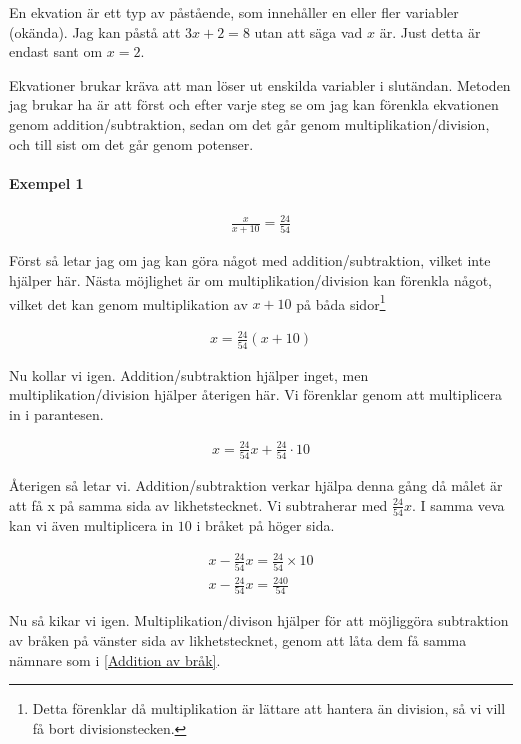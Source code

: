En ekvation är ett typ av påstående, som innehåller en eller fler variabler (okända). Jag kan påstå att $3x+2 = 8$ utan att säga vad $x$ är. Just detta är endast sant om $x=2$.

Ekvationer brukar kräva att man löser ut enskilda variabler i slutändan. Metoden jag brukar ha är att först och efter varje steg se om jag kan förenkla ekvationen genom addition/subtraktion, sedan om det går genom multiplikation/division, och till sist om det går genom potenser.

\paragraph{Exempel 1}

\begin{align*}
	\frac{x}{x+10} = \frac{24}{54}
\end{align*}

Först så letar jag om jag kan göra något med addition/subtraktion, vilket inte hjälper här. Nästa möjlighet är om multiplikation/division kan förenkla något, vilket det kan genom multiplikation av $x+10$ på båda sidor\footnote{Detta förenklar då multiplikation är lättare att hantera än division, så vi vill få bort divisionstecken.}

\begin{align*}
	x = \frac{24}{54}(x+10)
\end{align*}

Nu kollar vi igen. Addition/subtraktion hjälper inget, men multiplikation/division hjälper återigen här. Vi förenklar genom att multiplicera in i parantesen.

\begin{align*}
	x = \frac{24}{54}x + \frac{24}{54} \cdot 10
\end{align*}

Återigen så letar vi. Addition/subtraktion verkar hjälpa denna gång då målet är att få x på samma sida av likhetstecknet. Vi subtraherar med $\frac{24}{54}x$. I samma veva kan vi även multiplicera in $10$ i bråket på höger sida.

\begin{align*}
	x - \frac{24}{54}x = \frac{24}{54} \times 10 \\
	x - \frac{24}{54}x = \frac{240}{54}
\end{align*}

Nu så kikar vi igen. Multiplikation/divison hjälper för att möjliggöra subtraktion av bråken på vänster sida av likhetstecknet, genom att låta dem få samma nämnare som i \ref{Addition av bråk}.

